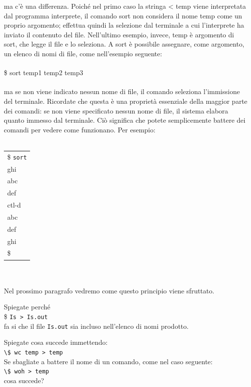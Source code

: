 ma c'è una differenza. Poiché nel primo caso la stringa < temp viene interpretata dal
programma interprete, il comando sort non considera il nome temp come un proprio
argomento; effettua quindi la selezione dal terminale a cui l'interprete ha inviato il
contenuto del file. Nell'ultimo esempio, invece, temp è argomento di sort, che legge il
file e lo seleziona. A sort è possibile assegnare, come argomento, un elenco di nomi di
file, come nell'esempio seguente:\\\\
\$ sort temp1 temp2 temp3\\\\
ma se non viene indicato nessun nome di file, il comando seleziona l'immissione del
terminale. Ricordate che questa è una proprietà essenziale della maggior parte dei comandi: se non viene specificato nessun nome di file, il sistema elabora quanto immesso dal terminale. Ciò significa che potete semplicemente battere dei comandi per
vedere come funzionano. Per esempio:\\\\
\begin{tabular}{l}
	\$ \lstinline|sort|\\
	ghi\\
	abc\\
	def\\
	ctl-d\\
	abc\\
	def\\
	ghi\\
	\$ 
\end{tabular}\\\\
Nel prossimo paragrafo vedremo come questo principio viene sfruttato.
\begin{eser}
	Spiegate perché\\
	\$ \lstinline|Is > Is.out|\\
	fa si che il file \lstinline|Is.out| sia incluso nell'elenco di nomi prodotto.
\end{eser}
\begin{eser}
	Spiegate cosa succede immettendo:\\
	\lstinline|\$ wc temp > temp|\\
	Se sbagliate a battere il nome di un comando, come nel caso seguente:\\
	\lstinline|\$ woh > temp|\\
	cosa succede?
\end{eser}
